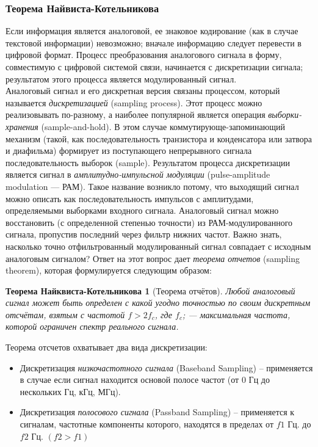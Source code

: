 \subsubsection{Теорема Найвиста-Котельникова} %
Если информация является аналоговой, ее знаковое кодирование (как в случае текстовой информации) невозможно; вначале информацию следует перевести в цифровой формат. Процесс преобразования аналогового сигнала в форму, совместимую с цифровой системой связи, начинается с дискретизации сигнала; результатом этого процесса является модулированный сигнал. \\\indent
Аналоговый сигнал и его дискретная версия связаны процессом, который называется {\it дискретизацией} (sampling process). Этот процесс можно реализовывать по-разному, а наиболее популярной является операция {\it выборки-хранения} (sample-and-hold). В этом случае коммутирующе-запоминающий механизм (такой, как последовательность транзистора и конденсатора или затвора и диафильма) формирует из поступающего непрерывного сигнала последовательность выборок (sample). Результатом процесса дискретизации является сигнал в {\it амплитудно-импульсной модуляции} (pulse-amplitude modulation — РАМ). Такое название возникло потому, что выходящий сигнал можно описать как последовательность импульсов с амплитудами, определяемыми выборками входного сигнала. Аналоговый сигнал можно восстановить (с определенной степенью точности) из РАМ-модулированного сигнала, пропустив последний через фильтр нижних частот. Важно знать, насколько точно отфильтрованный модулированный сигнал совпадает с исходным аналоговым сигналом? Ответ на этот вопрос дает {\it теорема отчетов} (sampling theorem), которая формулируется следующим образом:
	\newtheorem*{Th2*}{Теорема Найквиста-Котельникова}
	\begin{Th2*}[Теорема отчётов]\label{thKot}
Любой аналоговый сигнал может быть определен с какой угодно точностью по своим дискретным отсчётам, взятым с частотой $f>2f_c$, где $f_c$; — максимальная частота, которой ограничен спектр реального сигнала.
	\end{Th2*}
	
	
	Теорема отсчетов охватывает два вида дискретизации:
\begin{itemize}
	\item    Дискретизация {\it низкочастотного сигнала} (Baseband Sampling) – применяется в случае если сигнал находится основой полосе частот (от 0 Гц до нескольких Гц, кГц, МГц).
    \item	 Дискретизация {\it полосового сигнала} (Passband Sampling) – применяется к сигналам, частотные компоненты которого, находятся в пределах от $f1$ Гц. до $f2$ Гц. $(f2 > f1)$
    \end{itemize}
    
